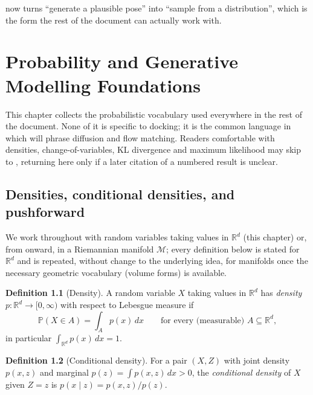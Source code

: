 \documentclass[11pt,a4paper]{report}
\theoremstyle{definition}
\newtheorem{definition}[definition]{Definition}
\theoremstyle{remark}
\newcommand{\RR}{\mathbb R}
\newcommand{\PP}{\mathbb P}
\begin{document}
 now turns ``generate a plausible pose'' into ``sample from a distribution'', which is the form the rest of the document can actually work with.

\clearpage

\chapter{Probability and Generative Modelling Foundations}
\label{chap:prob-foundations}

This chapter collects the probabilistic vocabulary used everywhere in the
rest of the document. None of it is specific to docking; it is the common
language in which  will phrase
diffusion and flow matching. Readers comfortable with densities,
change-of-variables, KL divergence and maximum likelihood may skip to
, returning here only if a later
citation of a numbered result is unclear.

\section{Densities, conditional densities, and pushforward}

We work throughout with random variables taking values in $\RR^d$ (this
chapter) or, from  onward, in a Riemannian manifold
$\mathcal M$; every definition below is stated for $\RR^d$ and is repeated,
without change to the underlying idea, for manifolds once the necessary
geometric vocabulary (volume forms) is available.

\begin{definition}[Density]
\label{def:density}
A random variable $X$ taking values in $\RR^d$ has \emph{density} $p:\RR^d\to[0,\infty)$
with respect to Lebesgue measure if
\[
\PP(X\in A) = \int_A p(x)\,dx
\qquad\text{for every (measurable) } A\subseteq\RR^d,
\]
in particular $\int_{\RR^d}p(x)\,dx=1$.
\end{definition}

\begin{definition}[Conditional density]
\label{def:conditional-density}
For a pair $(X,Z)$ with joint density $p(x,z)$ and marginal $p(z)=\int p(x,z)\,dx>0$,
the \emph{conditional density} of $X$ given $Z=z$ is $p(x\mid z)=p(x,z)/p(z)$.
\end{definition}
\end{document}
